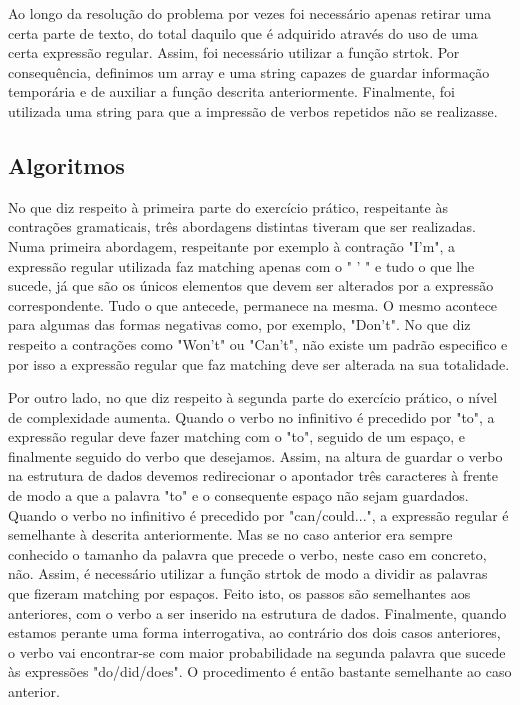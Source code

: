 \documentclass{report}
\begin{document}
Ao longo da resolução do problema por vezes foi necessário apenas retirar 
uma certa parte de texto, do total daquilo que é adquirido através do uso 
de uma certa expressão regular. Assim, foi necessário utilizar a função 
strtok. Por consequência,  definimos um array e uma string capazes de 
guardar informação temporária e de auxiliar a função descrita anteriormente. 
Finalmente, foi utilizada uma string para que a impressão de verbos 
repetidos não se realizasse. 

\subsection{Algoritmos}
No que diz respeito à primeira parte do exercício prático, respeitante 
às contrações gramaticais, três abordagens distintas tiveram que ser realizadas. 
Numa primeira abordagem, respeitante por exemplo à contração "I'm", a 
expressão regular utilizada faz matching apenas com o " ' " e tudo o que lhe sucede, 
já que são os únicos elementos que devem ser alterados por a expressão correspondente. 
Tudo o que antecede, permanece na mesma. O mesmo acontece para algumas das 
formas negativas como, por exemplo, "Don't". No que diz respeito a contrações como 
"Won't" ou "Can't", não existe um padrão especifico e por isso a expressão regular 
que faz matching deve ser alterada na sua totalidade.

Por outro lado, no que diz respeito à segunda parte do exercício prático, o 
nível de complexidade aumenta. Quando o verbo no infinitivo é 
precedido por "to", a expressão regular deve fazer matching com o  "to", 
seguido de um espaço, e finalmente seguido do verbo que desejamos. 
Assim, na altura de guardar o verbo na estrutura de dados devemos redirecionar 
o apontador três caracteres à frente de modo a que a palavra "to" e o 
consequente espaço não sejam guardados. Quando o verbo no infinitivo é precedido 
por "can/could...", a expressão regular é semelhante à descrita anteriormente. 
Mas se no caso anterior era sempre conhecido o tamanho da palavra que 
precede o verbo, neste caso em concreto, não. Assim, é necessário utilizar 
a função strtok de modo a dividir as palavras que fizeram matching por espaços. 
Feito isto, os passos são semelhantes aos anteriores, com o verbo a ser inserido 
na estrutura de dados. Finalmente, quando estamos perante uma forma interrogativa, 
ao contrário dos dois casos anteriores, o verbo vai encontrar-se com maior 
probabilidade na segunda palavra que sucede às expressões "do/did/does". 
O procedimento é então bastante semelhante ao caso anterior. 
\end{document}
